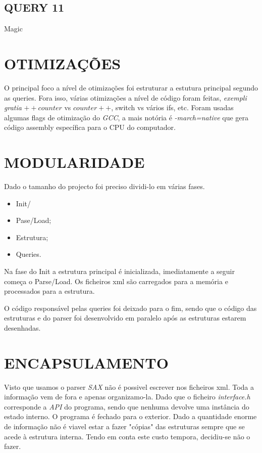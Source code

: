 \documentclass[letterpaper, 10 pt, conference]{IEEEtran}  %
\begin{document}
\subsection{QUERY 11}

Magic


\section{OTIMIZAÇÕES}

O principal foco a nível de otimizações foi estruturar a estutura principal segundo as queries. Fora isso, várias otimizações a nível de código foram feitas, \textit{exempli gratia} $++counter$ vs $counter++$, switch vs vários ifs, etc.
Foram usadas algumas flags de otimização do \textit{GCC}, a mais notória é \textit{-march=native} que gera código assembly específica para o CPU do computador.

\section{MODULARIDADE}

Dado o tamanho do projecto foi preciso dividi-lo em várias fases.

\begin{itemize}
\item Init/
\item Pase/Load;
\item Estrutura;
\item Queries.
\end{itemize}

Na fase do Init a estrutura principal é inicializada, imediatamente a seguir começa o Parse/Load. Os ficheiros xml são carregados para a memória e processados para a estrutura.

O código responsável pelas queries foi deixado para o fim, sendo que o código das estruturas e do parser foi desenvolvido em paralelo após as estruturas estarem desenhadas.




\section{ENCAPSULAMENTO}

Visto que usamos o parser \textit{SAX} não é possivel escrever nos ficheiros xml. Toda a informação vem de fora e apenas organizamo-la. Dado que o ficheiro \textit{interface.h} corresponde a \textit{API} do programa, sendo que nenhuma devolve uma instância do estado interno.
O programa é fechado para o exterior.
Dado a quantidade enorme de informação não é viavel estar a fazer "cópias" das estruturas sempre que se acede à estrutura interna. Tendo em conta este custo tempora, decidiu-se não o fazer.
\end{document}
